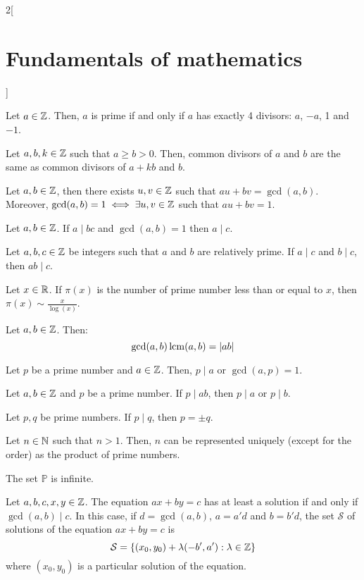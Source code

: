 \documentclass[../../../main.tex]{subfiles}
\begin{document}
\begin{multicols}{2}[\section{Fundamentals of mathematics}]
\begin{definition}
  \end{definition}
  \begin{proposition}
    Let $a\in\mathbb{Z}$. Then, $a$ is prime if and only if $a$ has exactly 4 divisors: $a$, $-a$, 1 and $-1$.
  \end{proposition}
  \begin{lemma}
    Let $a,b,k\in\mathbb{Z}$ such that $a\geq b>0$. Then, common divisors of $a$ and $b$ are the same as common divisors of $a+kb$ and $b$.
  \end{lemma}
  \begin{theorem}
    Let $a,b\in\mathbb{Z}$, then there exists $u,v\in\mathbb{Z}$ such that $au+bv=\gcd(a,b)$. Moreover, $\gcd(a,b)=1\iff\exists u,v\in\mathbb{Z}$ such that $au+bv=1$.
  \end{theorem}
  \begin{theorem}
    Let $a,b\in\mathbb{Z}$. If $a\mid bc$ and $\gcd(a,b)=1$ then $a\mid c$.
  \end{theorem}
  \begin{corollary}
    Let $a,b,c\in\mathbb{Z}$ be integers such that $a$ and $b$ are relatively prime. If $a\mid c$ and $b\mid c$, then $ab\mid c$.
  \end{corollary}
  \begin{theorem}
    Let $x\in\mathbb{R}$. If $\pi(x)$ is the number of prime number less than or equal to $x$, then $\pi(x)\sim\frac{x}{\log(x)}$.
  \end{theorem}
  \begin{theorem}
    Let $a,b\in\mathbb{Z}$. Then: $$\gcd(a,b)\operatorname{lcm}(a,b)=|ab|$$
  \end{theorem}
  \begin{lemma}
    Let $p$ be a prime number and $a\in\mathbb{Z}$. Then, $p\mid a$ or $\gcd(a,p)=1$.
  \end{lemma}
  \begin{corollary}
    Let $a,b\in\mathbb{Z}$ and $p$ be a prime number. If $p\mid ab$, then $p\mid a$ or $p\mid b$.
  \end{corollary}
  \begin{corollary}
    Let $p,q$ be prime numbers. If $p\mid q$, then $p=\pm q$.
  \end{corollary}
  \begin{theorem}
    Let $n\in\mathbb{N}$ such that $n>1$. Then, $n$ can be represented uniquely (except for the order) as the product of prime numbers.
  \end{theorem}
  \begin{theorem}
    The set $\mathbb{P}$ is infinite.
  \end{theorem}
  \begin{theorem}
    Let $a,b,c,x,y\in\mathbb{Z}$. The equation $ax+by=c$ has at least a solution if and only if $\gcd(a,b)\mid c$. In this case, if $d=\gcd(a,b)$, $a=a'd$ and $b=b'd$, the set $\mathcal{S}$ of solutions of the equation $ax+by=c$ is $$\mathcal{S}=\{(x_0,y_0)+\lambda(-b',a'):\lambda\in\mathbb{Z}\}$$ where $(x_0,y_0)$ is a particular solution of the equation.
  \end{theorem}

\end{multicols}
\end{document}
